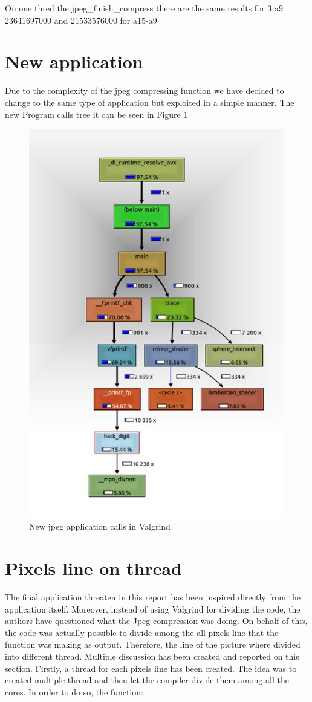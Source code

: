 \documentclass[journal]{IEEEtran}
\begin{document}
On one thred the jpeg\_finish\_compress there are the same results for 3 a9 23641697000 and 21533576000 for a15-a9



\section{New application}
Due to the complexity of the jpeg compressing function we have decided to change to the same type of application but exploited in a simple manner. The new Program calls tree it can be seen in Figure \ref{fig:valgrind2}

\begin{figure}[!h]
	\centering
	\includegraphics[width=.8\linewidth]{valgrind2}
	\caption{New jpeg application calls in Valgrind}
	\label{fig:valgrind2}
\end{figure}


\section{Pixels line on thread}
The final application threaten in this report has been inspired directly from the application itself. Moreover, instead of using Valgrind for dividing the code, the authors have questioned what the Jpeg compression was doing. On behalf of this, the code was actually possible to divide among the all pixels line that the function was making as output. Therefore, the line of the picture where divided into different thread. Multiple discussion has been created and reported on this section.
Firstly, a thread for each pixels line has been created. The idea was to created multiple thread and then let the compiler divide them among all the cores. 
In order to do so, the function:
\end{document}
